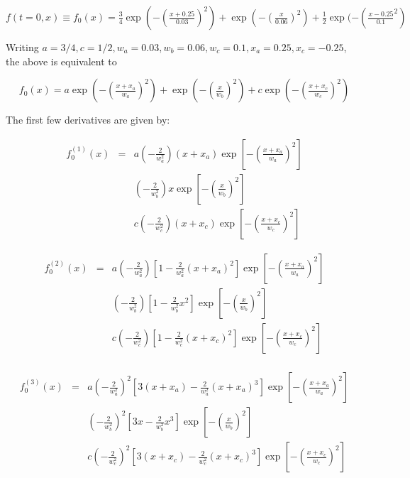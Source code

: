 \documentclass[11pt]{article}
\begin{document}
$$f(t = 0, x) \equiv f_0(x) = \tfrac{3}{4} \exp(-\left(\tfrac{x + 0.25}{0.03}\right)^2) + \exp(-\left(\tfrac{x}{0.06}\right)^2) + \tfrac{1}{2}\exp(-(\tfrac{x - 0.25}{0.1}^2)$$ 

Writing $a = 3/4, c = 1/2, w_a = 0.03, w_b = 0.06, w_c = 0.1, x_a = 0.25, x_c = -0.25$, the above is equivalent to

$$f_0(x) = a\exp(-\left(\tfrac{x + x_a}{w_a}\right)^2) + \exp(-\left(\tfrac{x}{w_b}\right)^2) + c\exp(-(\tfrac{x + x_c}{w_c})^2)$$ 

The first few derivatives are given by:

\begin{eqnarray*}
f^{(1)}_0(x) & = & a\left(-\frac{2}{w_a^2}\right)(x + x_a)\exp\left[-\left(\frac{x + x_a}{w_a}\right)^2\right] \\[1em]
& & \left(-\frac{2}{w_b^2}\right)x\exp\left[-\left(\frac{x}{w_b}\right)^2\right]\\[1em]
& & c\left(-\frac{2}{w_c^2}\right)(x + x_c)\exp\left[-\left(\frac{x + x_c}{w_c}\right)^2\right]
\end{eqnarray*}

\begin{eqnarray*}
f^{(2)}_0(x) & = & a\left(-\frac{2}{w_a^2}\right)\left[1 - \frac{2}{w_a^2}(x + x_a)^2\right]\exp\left[-\left(\frac{x + x_a}{w_a}\right)^2\right] \\
& & \left(-\frac{2}{w_b^2}\right)\left[1 - \frac{2}{w_b^2}x^2\right]\exp\left[-\left(\frac{x}{w_b}\right)^2\right] \\
& & c\left(-\frac{2}{w_c^2}\right)\left[1 - \frac{2}{w_c^2}(x + x_c)^2\right]\exp\left[-\left(\frac{x + x_c}{w_c}\right)^2\right] \\
\end{eqnarray*}

\begin{eqnarray*}
f^{(3)}_0(x) & = & a\left(-\frac{2}{w_a^2}\right)^2\left[3(x + x_a) - \frac{2}{w_a^2}(x + x_a)^3\right]\exp\left[-\left(\frac{x + x_a}{w_a}\right)^2\right] \\[1em]
& & \left(-\frac{2}{w_b^2}\right)^2\left[3x - \frac{2}{w_b^2}x^3\right]\exp\left[-\left(\frac{x}{w_b}\right)^2\right] \\[1em]
& & c\left(-\frac{2}{w_c^2}\right)^2\left[3(x + x_c) - \frac{2}{w_c^2}(x + x_c)^3\right]\exp\left[-\left(\frac{x + x_c}{w_c}\right)^2\right]
\end{eqnarray*}
\end{document}
